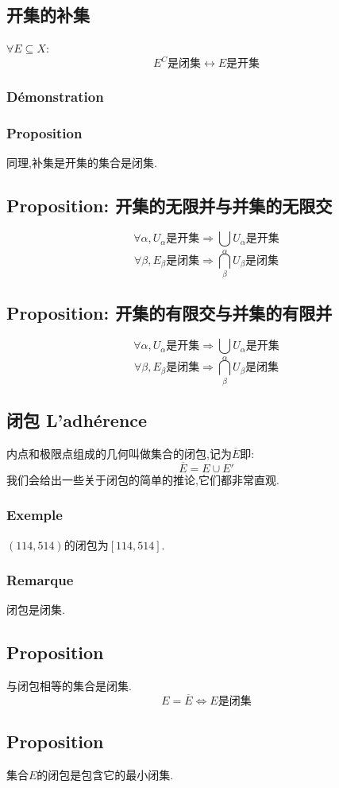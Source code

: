 \documentclass[12pt, a4paper, oneside]{ctexbook}
\begin{document}
  \subsection{开集的补集}
  $\forall E\subseteq X:$
  $$
  E^C\text{是闭集}\leftrightarrow E\text{是开集}
  $$
  \subsubsection{Démonstration}
  \subsubsection{Proposition}
  同理,补集是开集的集合是闭集.
  \subsection{Proposition: 开集的无限并与并集的无限交}
  $$
  \forall \alpha ,U_\alpha\text{是开集}\Rightarrow\bigcup_\alpha U_\alpha\text{是开集}
  $$
  $$
  \forall \beta ,E_\beta\text{是闭集}\Rightarrow\bigcap_\beta U_\beta\text{是闭集}
  $$
  \subsection{Proposition: 开集的有限交与并集的有限并}
  $$
  \forall \alpha ,U_\alpha\text{是开集}\Rightarrow\bigcup_\alpha U_\alpha\text{是开集}
  $$
  $$
  \forall \beta ,E_\beta\text{是闭集}\Rightarrow\bigcap_\beta U_\beta\text{是闭集}
  $$

  \subsection{闭包 L'adhérence}
  内点和极限点组成的几何叫做集合的闭包,记为$\overline{E}$即:
  $$
  \overline{E}=E\cup E'
  $$
  我们会给出一些关于闭包的简单的推论,它们都非常直观.
  \subsubsection{Exemple}
  $(114,514)$的闭包为$[114,514]$.
  \subsubsection{Remarque}
  闭包是闭集.
  \subsection{Proposition}
  与闭包相等的集合是闭集.
  $$
  E=\overline{E}\Leftrightarrow E\text{是闭集}
  $$
  \subsection{Proposition}
  集合$E$的闭包是包含它的最小闭集.
\end{document}

